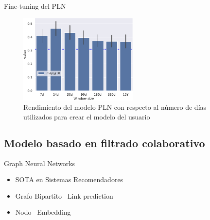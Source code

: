 \begin{frame}{Fine-tuning del PLN}
    \begin{figure}
        \centering
        \includegraphics[height=45mm]{./images/graphs/11_cosine_results_window-size_W-THU_normalize=True_beamer.pdf}
        \caption{Rendimiento del modelo PLN con respecto al número de días utilizados para crear el modelo del usuario}
    \end{figure}
\end{frame}

\subsection{Modelo basado en filtrado colaborativo}

\begin{frame}{Graph Neural Networks}
    \begin{itemize}[<+->]
        \item SOTA en Sistemas Recomendadores
        \item Grafo Bipartito \textrightarrow\ Link prediction
        \item Nodo \textrightarrow\ Embedding
    \end{itemize}
\end{frame}

